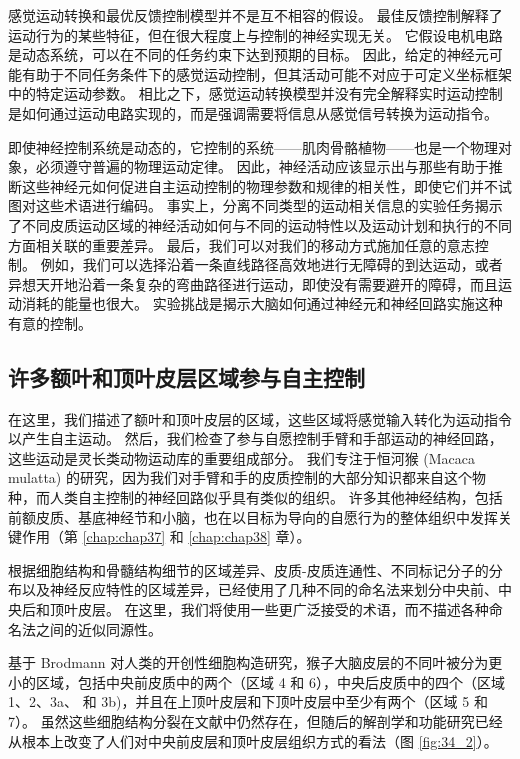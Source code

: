 感觉运动转换和最优反馈控制模型并不是互不相容的假设。
最佳反馈控制解释了运动行为的某些特征，但在很大程度上与控制的神经实现无关。
它假设电机电路是动态系统，可以在不同的任务约束下达到预期的目标。
因此，给定的神经元可能有助于不同任务条件下的感觉运动控制，但其活动可能不对应于可定义坐标框架中的特定运动参数。
相比之下，感觉运动转换模型并没有完全解释实时运动控制是如何通过运动电路实现的，而是强调需要将信息从感觉信号转换为运动指令。


即使神经控制系统是动态的，它控制的系统——肌肉骨骼植物——也是一个物理对象，必须遵守普遍的物理运动定律。
因此，神经活动应该显示出与那些有助于推断这些神经元如何促进自主运动控制的物理参数和规律的相关性，即使它们并不试图对这些术语进行编码。
事实上，分离不同类型的运动相关信息的实验任务揭示了不同皮质运动区域的神经活动如何与不同的运动特性以及运动计划和执行的不同方面相关联的重要差异。
最后，我们可以对我们的移动方式施加任意的意志控制。
例如，我们可以选择沿着一条直线路径高效地进行无障碍的到达运动，或者异想天开地沿着一条复杂的弯曲路径进行运动，即使没有需要避开的障碍，而且运动消耗的能量也很大。
实验挑战是揭示大脑如何通过神经元和神经回路实施这种有意的控制。



\subsection{许多额叶和顶叶皮层区域参与自主控制}

在这里，我们描述了额叶和顶叶皮层的区域，这些区域将感觉输入转化为运动指令以产生自主运动。
然后，我们检查了参与自愿控制手臂和手部运动的神经回路，这些运动是灵长类动物运动库的重要组成部分。
我们专注于恒河猴 (Macaca mulatta) 的研究，因为我们对手臂和手的皮质控制的大部分知识都来自这个物种，而人类自主控制的神经回路似乎具有类似的组织。
许多其他神经结构，包括前额皮质、基底神经节和小脑，也在以目标为导向的自愿行为的整体组织中发挥关键作用（第 \ref{chap:chap37} 和 \ref{chap:chap38} 章）。


根据细胞结构和骨髓结构细节的区域差异、皮质-皮质连通性、不同标记分子的分布以及神经反应特性的区域差异，已经使用了几种不同的命名法来划分中央前、中央后和顶叶皮层。
在这里，我们将使用一些更广泛接受的术语，而不描述各种命名法之间的近似同源性。


基于 Brodmann 对人类的开创性细胞构造研究，猴子大脑皮层的不同叶被分为更小的区域，包括中央前皮质中的两个（区域 4 和 6），中央后皮质中的四个（区域 1、2、3a、 和 3b)，并且在上顶叶皮层和下顶叶皮层中至少有两个（区域 5 和 7）。
虽然这些细胞结构分裂在文献中仍然存在，但随后的解剖学和功能研究已经从根本上改变了人们对中央前皮层和顶叶皮层组织方式的看法（图 \ref{fig:34_2}）。

